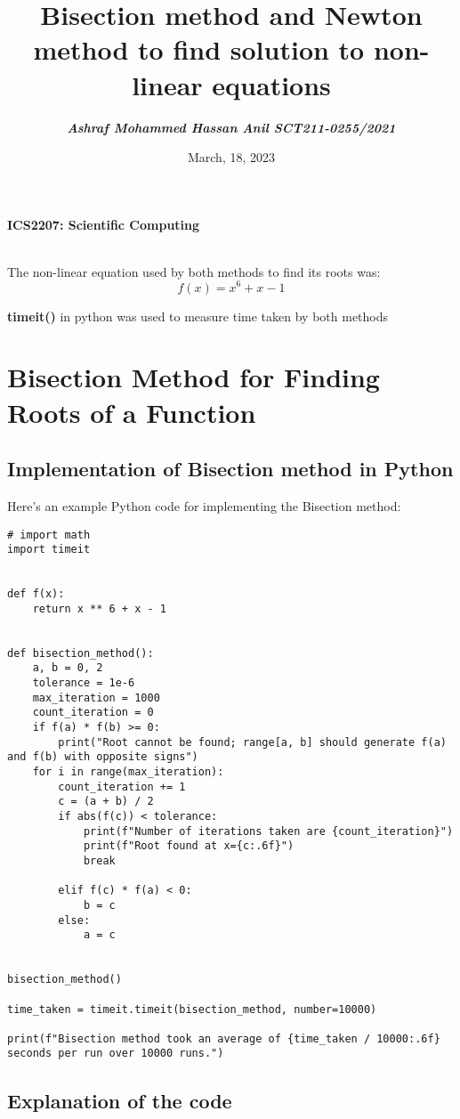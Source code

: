\documentclass{article}
\title{Bisection method and Newton method to find solution to non-linear equations}
\author{\textbf{\textit{Ashraf Mohammed Hassan Anil  SCT211-0255/2021}}}
\date{March, 18, 2023}
\begin{document}
\maketitle
\begin{Large}\textbf{ICS2207: Scientific Computing}
\end{Large}\\[12pt]

The non-linear equation used by both methods to find its roots was:
\textbf{$$f(x) = x^6 + x - 1$$}


\textbf{timeit()} in python was used to measure time taken by both methods

\section{Bisection Method for Finding Roots of a Function}

\subsection{Implementation of Bisection method in Python}

Here's an example Python code for implementing the Bisection method:


\begin{verbatim}
# import math
import timeit


def f(x):
    return x ** 6 + x - 1


def bisection_method():
    a, b = 0, 2
    tolerance = 1e-6
    max_iteration = 1000
    count_iteration = 0
    if f(a) * f(b) >= 0:
        print("Root cannot be found; range[a, b] should generate f(a) and f(b) with opposite signs")
    for i in range(max_iteration):
        count_iteration += 1
        c = (a + b) / 2
        if abs(f(c)) < tolerance:
            print(f"Number of iterations taken are {count_iteration}")
            print(f"Root found at x={c:.6f}")
            break

        elif f(c) * f(a) < 0:
            b = c
        else:
            a = c


bisection_method()

time_taken = timeit.timeit(bisection_method, number=10000)

print(f"Bisection method took an average of {time_taken / 10000:.6f} seconds per run over 10000 runs.")

\end{verbatim}

\subsection{Explanation of the code}
\end{document}
